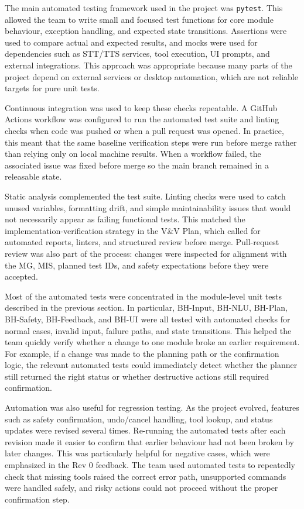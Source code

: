 \documentclass[12pt]{article}
\begin{document}
The main automated testing framework used in the project was
\texttt{pytest}. This allowed the team to write small and focused test
functions for core module behaviour, exception handling, and expected
state transitions. Assertions were used to compare actual and expected
results, and mocks were used for dependencies such as STT/TTS services,
tool execution, UI prompts, and external integrations. This approach
was appropriate because many parts of the project depend on external
services or desktop automation, which are not reliable targets for
pure unit tests.

Continuous integration was used to keep these checks repeatable. A
GitHub Actions workflow was configured to run the automated test suite
and linting checks when code was pushed or when a pull request was
opened. In practice, this meant that the same baseline verification
steps were run before merge rather than relying only on local machine
results. When a workflow failed, the associated issue was fixed before
merge so the main branch remained in a releasable state.

Static analysis complemented the test suite. Linting checks were used
to catch unused variables, formatting drift, and simple maintainability
issues that would not necessarily appear as failing functional tests.
This matched the implementation-verification strategy in the V\&V Plan,
which called for automated reports, linters, and structured review
before merge. Pull-request review was also part of the process: changes
were inspected for alignment with the MG, MIS, planned test IDs, and
safety expectations before they were accepted.

Most of the automated tests were concentrated in the module-level unit
tests described in the previous section. In particular, BH-Input,
BH-NLU, BH-Plan, BH-Safety, BH-Feedback, and BH-UI were all tested
with automated checks for normal cases, invalid input, failure paths,
and state transitions. This helped the team quickly verify whether a
change to one module broke an earlier requirement. For example, if a
change was made to the planning path or the confirmation logic, the
relevant automated tests could immediately detect whether the planner
still returned the right status or whether destructive actions still
required confirmation.

Automation was also useful for regression testing. As the project
evolved, features such as safety confirmation, undo/cancel handling,
tool lookup, and status updates were revised several times. Re-running
the automated tests after each revision made it easier to confirm that
earlier behaviour had not been broken by later changes. This was
particularly helpful for negative cases, which were emphasized in the
Rev 0 feedback. The team used automated tests to repeatedly check that
missing tools raised the correct error path, unsupported commands were
handled safely, and risky actions could not proceed without the proper
confirmation step.
\end{document}
